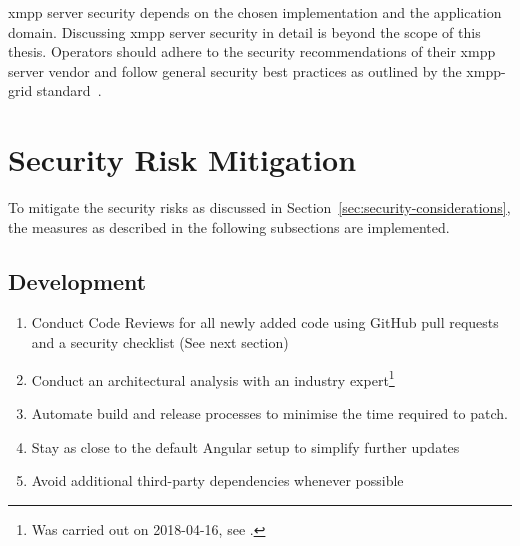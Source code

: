 \gls{xmpp} server security depends on the chosen implementation and the application domain.
Discussing \gls{xmpp} server security in detail is beyond the scope of this thesis.
Operators should adhere to the security recommendations of their \gls{xmpp} server vendor and follow general security best practices as outlined by the \gls{xmpp-grid} standard~\cite{ietf-mile-xmpp-grid-05}.

\section{Security Risk Mitigation}\label{sec:security-risk-mitigation}

To mitigate the security risks as discussed in Section~\ref{sec:security-considerations}, the measures as described in the following subsections are implemented.

\subsection{Development}

\begin{enumerate}
    \item Conduct Code Reviews for all newly added code using GitHub pull requests and a security checklist (See next section)
    \item Conduct an architectural analysis with an industry expert\footnote{Was carried out on 2018-04-16, see .}
    \item Automate build and release processes to minimise the time required to patch.
    \item Stay as close to the default Angular setup to simplify further updates
    \item Avoid additional third-party dependencies whenever possible
\end{enumerate}

